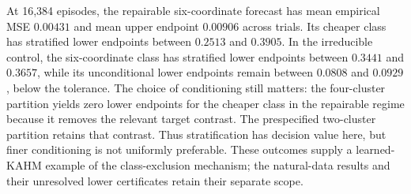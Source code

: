 At 16,384 episodes, the repairable six-coordinate forecast has mean empirical
MSE $0.00431$ and mean upper endpoint $0.00906$ across trials. Its cheaper
class has stratified lower endpoints between $0.2513$ and $0.3905$. In the
irreducible control, the six-coordinate class has stratified lower endpoints
between $0.3441$ and $0.3657$, while its unconditional lower endpoints remain
between $0.0808$ and $0.0929$, below the tolerance. The choice of conditioning
still matters: the four-cluster partition yields zero lower endpoints for
the cheaper class in the repairable regime because it removes the relevant
target contrast. The prespecified two-cluster partition retains that contrast.
Thus stratification has decision value here, but finer conditioning is not
uniformly preferable. These outcomes supply a learned-KAHM example of the
class-exclusion mechanism; the natural-data results and their unresolved
lower certificates retain their separate scope.
